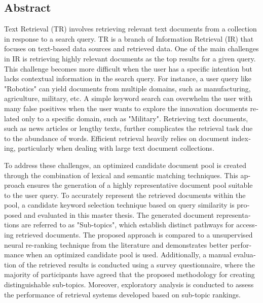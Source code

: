 \begin{otherlanguage}{english}
    \section*{Abstract}

Text Retrieval (TR) involves retrieving relevant text documents from a collection in response to a search query. \ac{TR} is a branch of Information Retrieval (IR) that focuses on text-based data sources and retrieved data. One of the main challenges in \ac{IR} is retrieving highly relevant documents as the top results for a given query. This challenge becomes more difficult when the user has a specific intention but lacks contextual information in the search query. For instance, a user query like "Robotics" can yield documents from multiple domains, such as manufacturing, agriculture, military, etc. A simple keyword search can overwhelm the user with many false positives when the user wants to explore the innovation documents related only to a specific domain, such as "Military". Retrieving text documents, such as news articles or lengthy texts, further complicates the retrieval task due to the abundance of words. Efficient retrieval heavily relies on document indexing, particularly when dealing with large text document collections.

To address these challenges, an optimized candidate document pool is created through the combination of lexical and semantic matching techniques. This approach ensures the generation of a highly representative document pool suitable to the user query. To accurately represent the retrieved documents within the pool, a candidate keyword selection technique based on query similarity is proposed and evaluated in this master thesis. The generated document representations are referred to as "Sub-topics", which establish distinct pathways for accessing retrieved documents. The proposed approach is compared to a unsupervised neural re-ranking technique from the literature and demonstrates better performance when an optimized candidate pool is used. Additionally, a manual evaluation of the retrieved results is conducted using a survey questionnaire, where the majority of participants have agreed that the proposed methodology for creating distinguishable sub-topics. Moreover, exploratory analysis is conducted to assess the performance of retrieval systems developed based on sub-topic rankings.


\end{otherlanguage}
